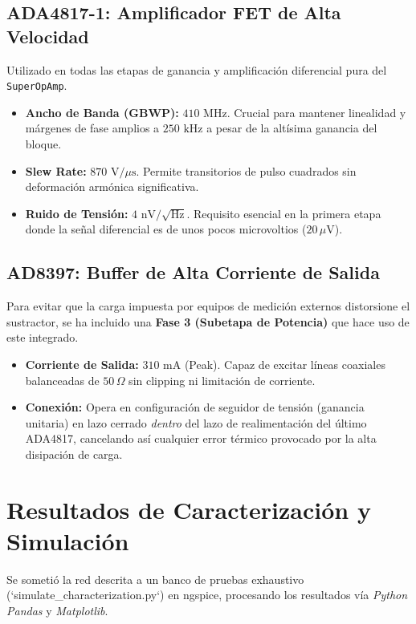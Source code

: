 \documentclass[11pt, a4paper]{article}
\begin{document}
\subsection{ADA4817-1: Amplificador FET de Alta Velocidad}
Utilizado en todas las etapas de ganancia y amplificación diferencial pura del \texttt{SuperOpAmp}.
\begin{itemize}
    \item \textbf{Ancho de Banda (GBWP):} $410\text{ MHz}$. Crucial para mantener linealidad y márgenes de fase amplios a $250\text{ kHz}$ a pesar de la altísima ganancia del bloque.
    \item \textbf{Slew Rate:} $870\text{ V/}\mu\text{s}$. Permite transitorios de pulso cuadrados sin deformación armónica significativa.
    \item \textbf{Ruido de Tensión:} $4\text{ nV/}\sqrt{\text{Hz}}$. Requisito esencial en la primera etapa donde la señal diferencial es de unos pocos microvoltios ($20\,\mu\text{V}$).
\end{itemize}

\subsection{AD8397: Buffer de Alta Corriente de Salida}
Para evitar que la carga impuesta por equipos de medición externos distorsione el sustractor, se ha incluido una \textbf{Fase 3 (Subetapa de Potencia)} que hace uso de este integrado.
\begin{itemize}
    \item \textbf{Corriente de Salida:} $310\text{ mA}$ (Peak). Capaz de excitar líneas coaxiales balanceadas de $50\,\Omega$ sin clipping ni limitación de corriente.
    \item \textbf{Conexión:} Opera en configuración de seguidor de tensión (ganancia unitaria) en lazo cerrado \textit{dentro} del lazo de realimentación del último ADA4817, cancelando así cualquier error térmico provocado por la alta disipación de carga.
\end{itemize}

\newpage
\section{Resultados de Caracterización y Simulación}

Se sometió la red descrita a un banco de pruebas exhaustivo (`simulate\_characterization.py`) en ngspice, procesando los resultados vía \textit{Python Pandas} y \textit{Matplotlib}.
\end{document}
